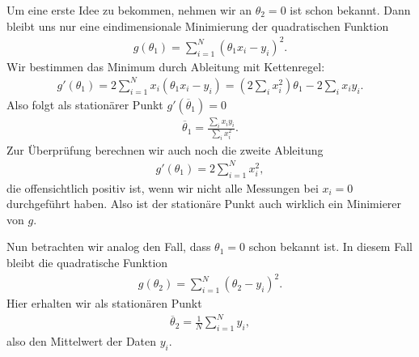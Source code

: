 \documentclass[letterpaper,10pt,english]{jupyterBook}
\begin{document}
Um eine erste Idee zu bekommen, nehmen wir an \(\theta_2 = 0\) ist schon bekannt. Dann bleibt uns nur eine eindimensionale Minimierung der quadratischen Funktion
\begin{equation*}
\begin{split} g(\theta_1) =  \sum_{i=1}^N (\theta_1 x_i   -y_i)^2 .\end{split}
\end{equation*}
Wir bestimmen das Minimum durch Ableitung mit Kettenregel:
\begin{equation*}
\begin{split} g'(\theta_1) = 2 \sum_{i=1}^N x_i (\theta_1 x_i   -y_i) = (2 \sum_i x_i^2) \theta_1 - 2 \sum_i x_i y_i. \end{split}
\end{equation*}
Also folgt als stationärer Punkt \(g'(\overline{\theta}_1) = 0\)
\begin{equation*}
\begin{split} \overline{\theta}_1 = \frac{\sum_i x_i y_i}{\sum_i x_i^2}.\end{split}
\end{equation*}
Zur Überprüfung berechnen wir auch noch die zweite Ableitung
\begin{equation*}
\begin{split} g'(\theta_1) =  2 \sum_{i=1}^N x_i^2, \end{split}
\end{equation*}
die offensichtlich positiv ist, wenn wir nicht alle Messungen bei \(x_i = 0\) durchgeführt haben. Also ist der stationäre Punkt auch wirklich ein Minimierer von \(g\).

Nun betrachten wir analog den Fall, dass \(\theta_1 = 0\) schon bekannt ist. In diesem Fall bleibt die quadratische Funktion
\begin{equation*}
\begin{split}  g(\theta_2) =  \sum_{i=1}^N (\theta_2   -y_i)^2 .\end{split}
\end{equation*}
Hier erhalten wir als stationären Punkt
\begin{equation*}
\begin{split} \overline{\theta}_2 = \frac{1}N  \sum_{i=1}^N y_i, \end{split}
\end{equation*}
also den Mittelwert der Daten \(y_i\).
\end{document}
